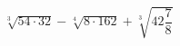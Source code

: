 \begin{ex}[type=calculate]
	\begin{condition}
		\( \sqrt[3]{54\cdot32}-\sqrt[4]{8\cdot162}+\sqrt[3]{42\dfrac{7}{8}} \)
	\end{condition}
\end{ex}